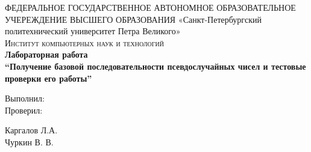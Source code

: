 \documentclass{article}
\begin{document}
	\begin{titlepage}
		\center 
		ФЕДЕРАЛЬНОЕ ГОСУДАРСТВЕННОЕ АВТОНОМНОЕ ОБРАЗОВАТЕЛЬНОЕ УЧЕРЕЖДЕНИЕ ВЫСШЕГО ОБРАЗОВАНИЯ\linebreak  
		«Санкт-Петербургский политехнический университет Петра Великого»\\[2cm]
		\textsc{\Large Институт компьютерных наук и технологий}\\[6.5cm]
		
		{\huge \bfseries Лабораторная работа\\[0.4cm]
			\Large \mdseries “Получение базовой последовательности псевдослучайных чисел и тестовые проверки его работы”}\\[6.5cm]
		
		\begin{multicols}{2}
			\begin{flushright} \large
				
				{Выполнил:}\\[0.5cm]
				
				{Проверил:}
				
			\end{flushright}
			\begin{flushright}
				
				{Каргалов Л.А.}\\[0.5cm]
				
				{Чуркин В. В.}
				
			\end{flushright}
		\end{multicols}

		\flushright{
			{\today}\\[0.5cm]
		}
		
		\vfill %
	\end{titlepage}
	
	\tableofcontents
	\setcounter{page}{2}
	\newpage
		
\end{document}

